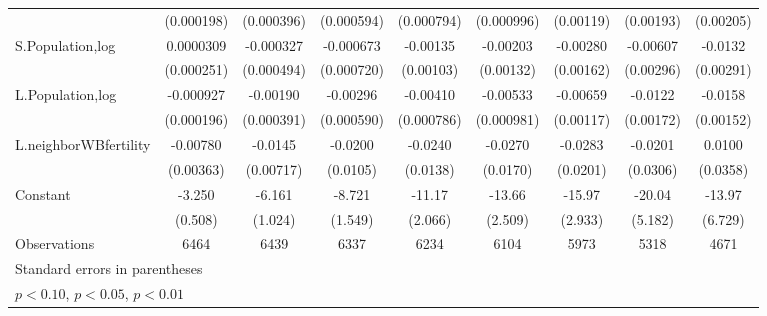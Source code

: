 \begin{table}[htbp]
\begin{tabular}{l*{8}{c}}
                    &  (0.000198)         &  (0.000396)         &  (0.000594)         &  (0.000794)         &  (0.000996)         &   (0.00119)         &   (0.00193)         &   (0.00205)         \\
[1em]
S.Population,log    &   0.0000309         &   -0.000327         &   -0.000673         &    -0.00135         &    -0.00203         &    -0.00280\sym{*}  &    -0.00607\sym{**} &     -0.0132\sym{***}\\
                    &  (0.000251)         &  (0.000494)         &  (0.000720)         &   (0.00103)         &   (0.00132)         &   (0.00162)         &   (0.00296)         &   (0.00291)         \\
[1em]
L.Population,log    &   -0.000927\sym{***}&    -0.00190\sym{***}&    -0.00296\sym{***}&    -0.00410\sym{***}&    -0.00533\sym{***}&    -0.00659\sym{***}&     -0.0122\sym{***}&     -0.0158\sym{***}\\
                    &  (0.000196)         &  (0.000391)         &  (0.000590)         &  (0.000786)         &  (0.000981)         &   (0.00117)         &   (0.00172)         &   (0.00152)         \\
[1em]
L.neighborWBfertility&    -0.00780\sym{**} &     -0.0145\sym{**} &     -0.0200\sym{*}  &     -0.0240\sym{*}  &     -0.0270         &     -0.0283         &     -0.0201         &      0.0100         \\
                    &   (0.00363)         &   (0.00717)         &    (0.0105)         &    (0.0138)         &    (0.0170)         &    (0.0201)         &    (0.0306)         &    (0.0358)         \\
[1em]
Constant            &      -3.250\sym{***}&      -6.161\sym{***}&      -8.721\sym{***}&      -11.17\sym{***}&      -13.66\sym{***}&      -15.97\sym{***}&      -20.04\sym{***}&      -13.97\sym{**} \\
                    &     (0.508)         &     (1.024)         &     (1.549)         &     (2.066)         &     (2.509)         &     (2.933)         &     (5.182)         &     (6.729)         \\
\hline
Observations        &        6464         &        6439         &        6337         &        6234         &        6104         &        5973         &        5318         &        4671         \\
\hline\hline
\multicolumn{9}{l}{\footnotesize Standard errors in parentheses}\\
\multicolumn{9}{l}{\footnotesize \sym{*} \(p<0.10\), \sym{**} \(p<0.05\), \sym{***} \(p<0.01\)}\\
\end{tabular}
\end{table}
